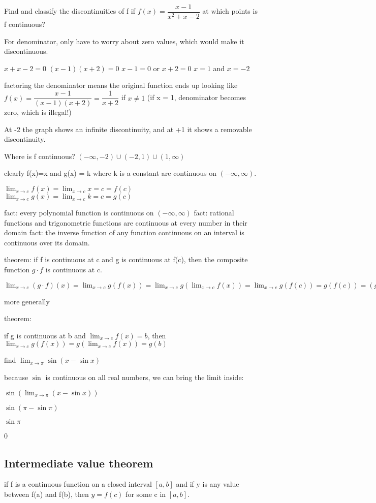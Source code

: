 \documentclass[12pt]{article}
\begin{document}
Find and classify the discontinuities of f if $f(x) = \dfrac{x-1}{x^2+x-2} $ at which points is f continuous?

For denominator, only have to worry about zero values, which would make it discontinuous.

$x+x-2=0$
$(x-1)(x+2)=0$
$x-1=0$ or $x+2=0$
$x=1$ and $x=-2$

factoring the denominator means the original function ends up looking like $f(x) = \dfrac{x-1}{(x-1)(x+2)} = \dfrac{1}{x+2} $
if $x \neq 1$ (if x = 1, denominator becomes zero, which is illegal!)

At -2 the graph shows an infinite discontinuity, and at +1 it shows a removable discontinuity.

Where is f continuous? $(-\infty,-2)\cup(-2,1)\cup(1,\infty)$

clearly f(x)=x and g(x) = k where k is a constant are continuous on $(-\infty,\infty)$.

$\lim_{x \to c}f(x) = \lim_{x \to c}x = c = f(c)$
$\lim_{x \to c}g(x) = \lim_{x \to c}k = c = g(c)$

fact: every polynomial function is continuous on $(-\infty,\infty)$
fact: rational functions and trigonometric functions are continuous at every number in their domain
fact: the inverse function of any function continuous on an interval is continuous over its domain.

theorem: if f is continuous at c and g is continuous at f(c), then the composite function $g \cdot f$ is
continuous at c.

$\lim_{x \to c}(g \cdot f)(x) = \lim_{x \to c}g(f(x)) = \lim_{x \to c}g(\lim_{x \to c}f(x)) = \lim_{x \to
  c}g(f(c)) = g(f(c)) = (g\cdot f)(c)$

more generally

theorem:

if g is continuous at b and $\lim_{x \to c}f(x) = b$, then $\lim_{x \to c}g(f(x)) = g(\lim_{x \to c}f(x)) =
g(b)$

find $\lim_{x \to \pi}\sin(x - \sin x)$

because $\sin$ is continuous on all real numbers, we can bring the limit inside:

$\sin(\lim_{x \to \pi}(x - \sin x))$

$\sin(\pi - \sin \pi)$

$\sin \pi$

0

\subsection{Intermediate value theorem}
if f is a continuous function on a closed interval $[a,b]$ and if y is any value between f(a) and f(b), then $y
= f(c)$ for some c in $[a,b]$.
\end{document}
